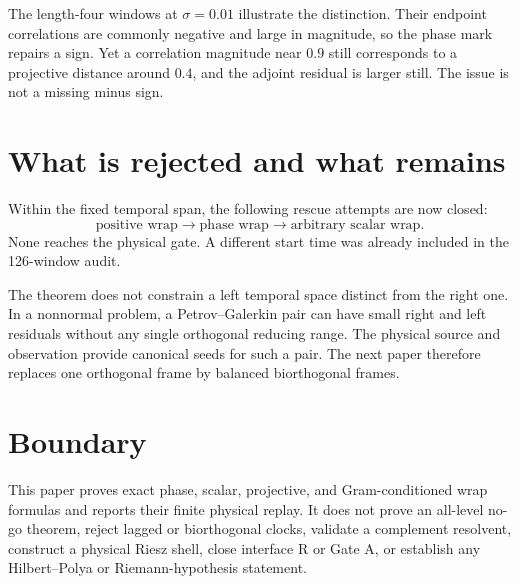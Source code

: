 \documentclass[12pt]{article}
\theoremstyle{remark}
\begin{document}
The length-four windows at $\sigma=0.01$ illustrate the distinction.  Their
endpoint correlations are commonly negative and large in magnitude, so the
phase mark repairs a sign.  Yet a correlation magnitude near $0.9$ still
corresponds to a projective distance around $0.4$, and the adjoint residual
is larger still.  The issue is not a missing minus sign.

\section{What is rejected and what remains}

Within the fixed temporal span, the following rescue attempts are now
closed:
\begin{equation}\label{eq:closed-repairs}
 \text{positive wrap}
 \longrightarrow
 \text{phase wrap}
 \longrightarrow
 \text{arbitrary scalar wrap}.
\end{equation}
None reaches the physical gate.  A different start time was already included
in the 126-window audit.

The theorem does not constrain a left temporal space distinct from the right
one.  In a nonnormal problem, a Petrov--Galerkin pair can have small right and
left residuals without any single orthogonal reducing range.  The physical
source and observation provide canonical seeds for such a pair.  The next
paper therefore replaces one orthogonal frame by balanced biorthogonal
frames.

\section{Boundary}

This paper proves exact phase, scalar, projective, and Gram-conditioned wrap
formulas and reports their finite physical replay.  It does not prove an
all-level no-go theorem, reject lagged or biorthogonal clocks, validate a
complement resolvent, construct a physical Riesz shell, close interface R or
Gate A, or establish any Hilbert--Polya or Riemann-hypothesis statement.



\end{document}
